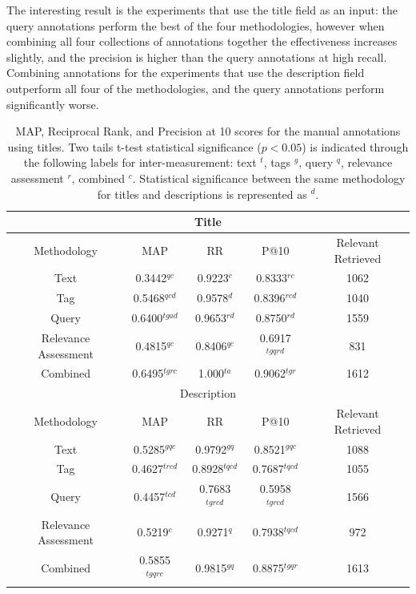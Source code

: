 The interesting result is the experiments that use the title field as an input: the query annotations perform the best of the four methodologies, however when combining all four collections of annotations together the effectiveness increases slightly, and the precision is higher than the query annotations at high recall. Combining annotations for the experiments that use the description field outperform all four of the methodologies, and the query annotations perform significantly worse.

\begin{table}[ht]
    \begin{tabular}{|c|c|c|c|c|}
        \multicolumn{5}{c}{Title}\\ \hline
         Methodology & MAP & RR & P@10 & Relevant Retrieved \\ \hline
         Text & 0.3442$^{qc}$ & 0.9223$^{c}$ & 0.8333$^{rc}$ & 1062 \\ \hline
         Tag & 0.5468$^{qcd}$ & 0.9578$^{d}$ & 0.8396$^{rcd}$ & 1040 \\ \hline
         Query & 0.6400$^{tgad}$ & 0.9653$^{rd}$ & 0.8750$^{rd}$ & 1559 \\ \hline
         Relevance Assessment & 0.4815$^{qc}$ & 0.8406$^{qc}$ & 0.6917$^{tgqrd}$ & 831 \\ \hline
         Combined & 0.6495$^{tgrc}$ & 1.000$^{ta}$ & 0.9062$^{tgr}$ & 1612 \\ \hline
         \multicolumn{5}{c}{Description} \\ \hline
         Methodology & MAP & RR & P@10 & Relevant Retrieved \\ \hline
         Text & 0.5285$^{gqc}$ & 0.9792$^{gq}$ & 0.8521$^{gqc}$ & 1088 \\ \hline
         Tag & 0.4627$^{trcd}$ & 0.8928$^{tqcd}$ & 0.7687$^{tqcd}$ & 1055 \\ \hline
         Query & 0.4457$^{tcd}$ & 0.7683$^{tgrcd}$ & 0.5958$^{tgrcd}$ & 1566 \\ \hline
         Relevance Assessment & 0.5219$^{c}$ & 0.9271$^{q}$ & 0.7938$^{tqcd}$ & 972 \\ \hline
         Combined & 0.5855$^{tgqrc}$ & 0.9815$^{gq}$ & 0.8875$^{tgqr}$ & 1613 \\ \hline         
    \end{tabular}
    \caption{MAP, Reciprocal Rank, and Precision at 10 scores for the manual annotations using titles. Two tails t-test statistical significance ($p<0.05$) is indicated through the following labels for inter-measurement: text $^t$, tags $^g$, query $^q$, relevance assessment $^r$, combined $^c$. Statistical significance between the same methodology for titles and descriptions is represented as $^d$.}
    \label{table:manual-results}
\end{table}

